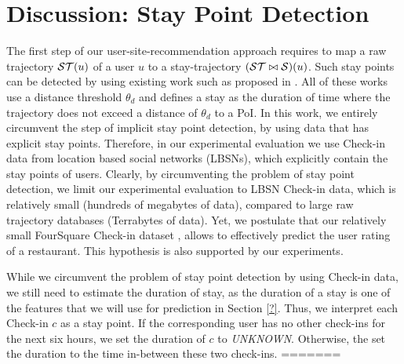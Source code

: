 \section{Discussion: Stay Point Detection} 
The first step of our user-site-recommendation approach requires to map a raw trajectory $\mathcal{ST}(u)$ of a user $u$ to a stay-trajectory $(\mathcal{ST}\bowtie\mathcal{S})(u)$. Such stay points can be detected by using existing work such as proposed in \cite{li2008mining,zheng2009mining,zheng2010geolife,xiao2010finding}. All of these works use a distance threshold $\theta_{d}$ and defines a stay as the duration of time where the trajectory does not exceed a distance of $\theta_{d}$ to a PoI. In this work, we entirely circumvent the step of implicit stay point detection, by using data that has explicit stay points. Therefore, in our experimental evaluation we use Check-in data from location based social networks (LBSNs), which explicitly contain the stay points of users. Clearly, by circumventing the problem of stay point detection, we limit our experimental evaluation to LBSN Check-in data, which is relatively small (hundreds of megabytes of data), compared to large raw trajectory databases (Terrabytes of data).
Yet, we postulate that our relatively small FourSquare Check-in dataset \cite{?}, allows to effectively predict the user rating of a restaurant. This hypothesis is also supported by our experiments.

While we circumvent the problem of stay point detection by using Check-in data, we still need to estimate the duration of stay, as the duration of a stay is one of the features that we will use for prediction in Section \ref{?}. Thus, we interpret each Check-in $c$ as a stay point. If the corresponding user has no other check-ins for the next six hours, we set the duration of $c$ to \emph{UNKNOWN}. Otherwise, the set the duration to the time in-between these two check-ins.   =======
